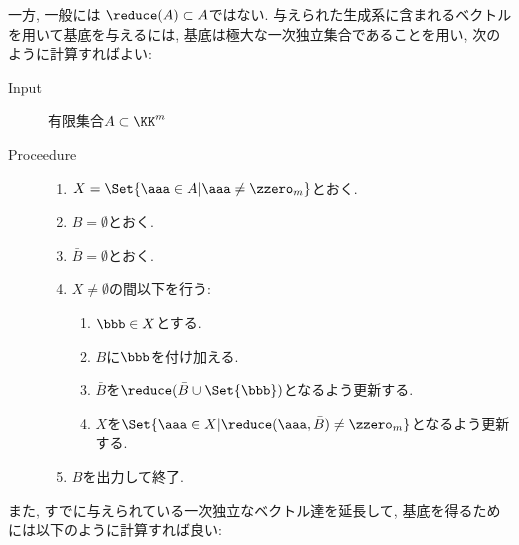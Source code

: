 一方,
一般には
$\reduce(A)\subset A$ではない.
与えられた生成系に含まれるベクトルを用いて基底を与えるには,
基底は極大な一次独立集合であることを用い,
次のように計算すればよい:
\begin{algorithm}\makebox{}
\begin{description}
\item[Input]
  有限集合$A\subset \KK^m$
\item[Proceedure]\makebox{}
  \begin{enumerate}
  \item $X=\Set{ \aaa\in A|\aaa\neq \zzero_m}$とおく.
  \item $B=\emptyset$とおく.
  \item $\bar B=\emptyset$とおく.
  \item $X\neq\emptyset$の間以下を行う:
    \begin{enumerate}
    \item $\bbb\in X$とする.
    \item $B$に$\bbb$を付け加える.
    \item $\bar B$を$\reduce(\bar B\cup \Set{\bbb})$となるよう更新する.
    \item $X$を$\Set{\aaa\in X| \reduce(\aaa,\bar B)\neq \zzero_m}$となるよう更新する.
    \end{enumerate}
  \item $B$を出力して終了.
  \end{enumerate}
\end{description}
\end{algorithm}
また,
すでに与えられている一次独立なベクトル達を延長して,
基底を得るためには以下のように計算すれば良い:
